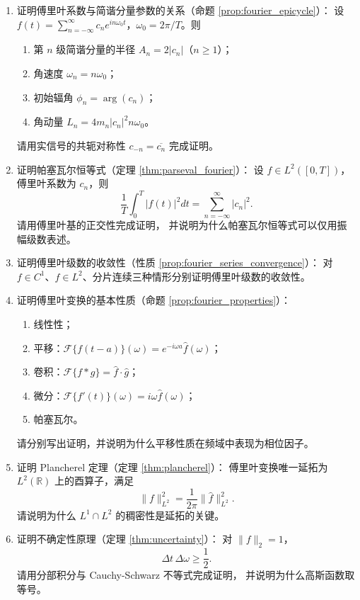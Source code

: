 \begin{enumerate}[leftmargin=3em, label=\textbf{题 \arabic*}]
    \item 证明傅里叶系数与简谐分量参数的关系（命题 \ref{prop:fourier_epicycle}）：
    设 $f(t)=\sum_{n=-\infty}^{\infty}c_ne^{in\omega_0t}$，$\omega_0=2\pi/T$。则
    \begin{enumerate}[label=(\roman*)]
        \item 第 $n$ 级简谐分量的半径 $A_n=2|c_n|$（$n\ge1$）；
        \item 角速度 $\omega_n=n\omega_0$；
        \item 初始辐角 $\phi_n=\arg(c_n)$；
        \item 角动量 $L_n=4m_n|c_n|^2n\omega_0$。
    \end{enumerate}
    请用实信号的共轭对称性 $c_{-n}=\overline{c_n}$ 完成证明。

    \item 证明帕塞瓦尔恒等式（定理 \ref{thm:parseval_fourier}）：
    设 $f\in L^2([0,T])$，傅里叶系数为 $c_n$，则
    \[
    \frac{1}{T}\int_0^T|f(t)|^2dt=\sum_{n=-\infty}^{\infty}|c_n|^2.
    \]
    请用傅里叶基的正交性完成证明，
    并说明为什么帕塞瓦尔恒等式可以仅用振幅级数表述。

    \item 证明傅里叶级数的收敛性（性质 \ref{prop:fourier_series_convergence}）：
    对 $f\in C^1$、$f\in L^2$、分片连续三种情形分别证明傅里叶级数的收敛性。

    \item 证明傅里叶变换的基本性质（命题 \ref{prop:fourier_properties}）：
    \begin{enumerate}[label=(\roman*)]
        \item 线性性；
        \item 平移：$\mathcal{F}\{f(t-a)\}(\omega)=e^{-i\omega a}\hat{f}(\omega)$；
        \item 卷积：$\mathcal{F}\{f*g\}=\hat{f}\cdot\hat{g}$；
        \item 微分：$\mathcal{F}\{f'(t)\}(\omega)=i\omega\hat{f}(\omega)$；
        \item 帕塞瓦尔。
    \end{enumerate}
    请分别写出证明，并说明为什么平移性质在频域中表现为相位因子。

    \item 证明 Plancherel 定理（定理 \ref{thm:plancherel}）：
    傅里叶变换唯一延拓为 $L^2(\mathbb{R})$ 上的酉算子，满足
    \[
    \|f\|_{L^2}^2=\frac{1}{2\pi}\|\hat f\|_{L^2}^2.
    \]
    请说明为什么 $L^1\cap L^2$ 的稠密性是延拓的关键。

    \item 证明不确定性原理（定理 \ref{thm:uncertainty}）：
    对 $\|f\|_2=1$，
    \[
    \Delta t\,\Delta\omega\ge\frac12.
    \]
    请用分部积分与 Cauchy-Schwarz 不等式完成证明，
    并说明为什么高斯函数取等号。


\end{enumerate}
